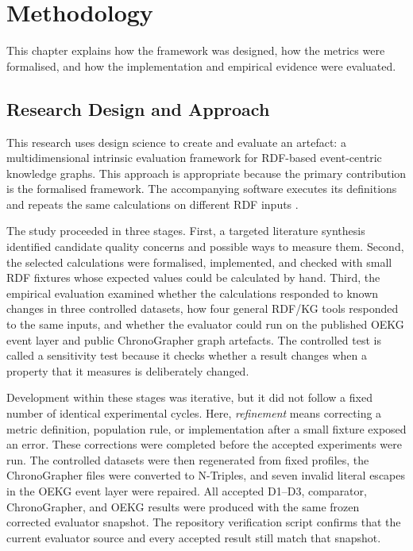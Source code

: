 \chapter{Methodology}

This chapter explains how the framework was designed, how the metrics were formalised, and how the implementation and empirical evidence were evaluated.

\section{Research Design and Approach}

This research uses design science to create and evaluate an artefact: a multidimensional intrinsic evaluation framework for RDF-based event-centric knowledge graphs. This approach is appropriate because the primary contribution is the formalised framework. The accompanying software executes its definitions and repeats the same calculations on different RDF inputs \citep{hevner2004}.

The study proceeded in three stages. First, a targeted literature synthesis identified candidate quality concerns and possible ways to measure them. Second, the selected calculations were formalised, implemented, and checked with small RDF fixtures whose expected values could be calculated by hand. Third, the empirical evaluation examined whether the calculations responded to known changes in three controlled datasets, how four general RDF/KG tools responded to the same inputs, and whether the evaluator could run on the published OEKG event layer and public ChronoGrapher graph artefacts. The controlled test is called a sensitivity test because it checks whether a result changes when a property that it measures is deliberately changed.

Development within these stages was iterative, but it did not follow a fixed number of identical experimental cycles. Here, \emph{refinement} means correcting a metric definition, population rule, or implementation after a small fixture exposed an error. These corrections were completed before the accepted experiments were run. The controlled datasets were then regenerated from fixed profiles, the ChronoGrapher files were converted to N-Triples, and seven invalid literal escapes in the OEKG event layer were repaired. All accepted D1--D3, comparator, ChronoGrapher, and OEKG results were produced with the same frozen corrected evaluator snapshot. The repository verification script confirms that the current evaluator source and every accepted result still match that snapshot.

